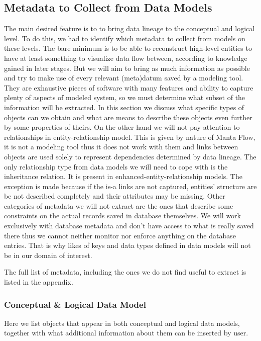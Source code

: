 \subsection{Metadata to Collect from Data Models}
\label{metadata_enumeration}

The main desired feature is to to bring data lineage to the conceptual and logical level. To do this, we had to identify which metadata to collect from models on these levels.
The bare minimum is to be able to reconstruct high-level entities to have at least something to visualize data flow between, according to knowledge gained in later stages.
But we will aim to bring as much information as possible and try to make use of every relevant (meta)datum saved by a modeling tool. 
They are exhaustive pieces of software with many features and ability to capture plenty of aspects of modeled system, so we must determine what subset of the information will be extracted.
In this section we discuss what specific types of objects can we obtain and what are means to describe these objects even further by some properties of theirs. 
On the other hand we will not pay attention to relationships in entity-relationship model. This is given by nature of Manta Flow, it is not a modeling tool thus it does not work with them and links between objects are used solely to represent dependencies determined by data lineage.
The only relationship type from data models we will need to cope with is the inheritance relation. It is present in enhanced-entity-relationship models. The exception is made because if the is-a links are not captured, entities' structure are be not described completely and their attributes may be missing.
Other categories of metadata we will not extract are the ones that describe some constraints on the actual records saved in database themselves. We will work exclusively with database metadata and don't have access to what is really saved there thus we cannot neither monitor nor enforce anything on the database entries. That is why likes of keys and data types defined in data models will not be in our domain of interest.

The full list of metadata, including the ones we do not find useful to extract is listed in the appendix.

\subsubsection{Conceptual \& Logical Data Model}

Here we list objects that appear in both conceptual and logical data models, together with what additional information about them can be inserted by user.

